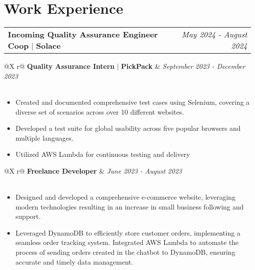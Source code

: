 \documentclass[a4paper,12pt]{article}
\begin{document}

\section{Work Experience}

\begin{tabularx}{\linewidth}{ @{}X r@{} }
    {\textbf{Incoming Quality Assurance Engineer Coop}}  $\vert$ {\textbf{Solace}} & \textit{May 2024 - August 2024} \\
    
\end{tabularx}


\begin{tabularx}{\linewidth}{ @{}X r@{} }
    {\textbf{Quality Assurance Intern}} $\vert$ {\textbf{PickPack}} & \textit{September 2023 - December 2023} \\
     \\
\end{tabularx}
\begin{itemize}[nosep,leftmargin=*]
    \item Created and documented comprehensive test cases using Selenium, covering a diverse set of scenarios across over 10 different websites.
    \item Developed a test suite for global usability across five popular browsers and multiple languages.
    \item Utilized AWS Lambda for continuous testing and delivery
\end{itemize}

\begin{tabularx}{\linewidth}{ @{}X r@{} }
    {\textbf{Freelance Developer}}  & \textit{June 2023 - August 2023} \\
     \\
\end{tabularx}
\begin{itemize}[nosep,leftmargin=*]
    \item Designed and developed a comprehensive e-commerce website, leveraging modern technologies resulting in an increase in small business following and support. 
    \item Leveraged DynamoDB to efficiently store customer orders, implementing a seamless order tracking system. Integrated AWS Lambda to automate the process of sending orders created in the chatbot to DynamoDB, ensuring accurate and timely data management.
\end{itemize}
\end{document}
